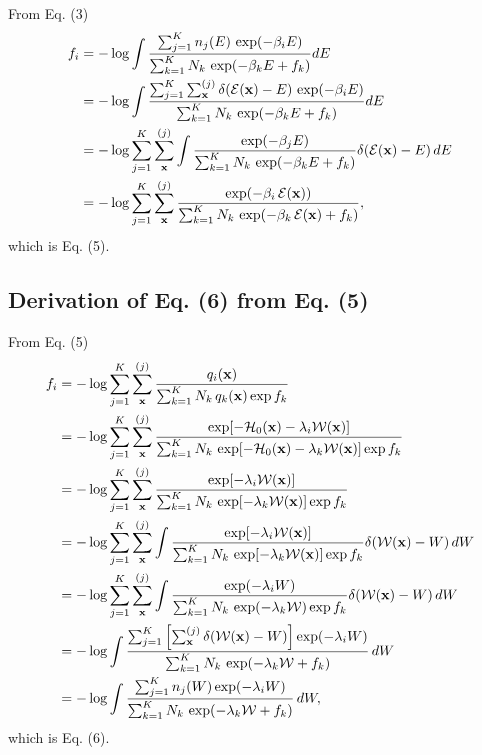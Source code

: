 \documentclass[aip,jcp,preprint,notitlepage, superscriptaddress]{revtex4-1}
\begin{document}
From Eq. (3)
\begin{align*}
f_i
&=
-\log
  \int
    \frac{
      \sum_{j = 1}^K n_j(E) \, \exp(-\beta_i E)
    }
    {
      \sum_{k = 1}^K N_k \, \exp(-\beta_k E + f_k)
    }
    dE
\\
&=
-\log
  \int
    \frac{
      \sum_{j = 1}^K \sum_{\mathbf{x}}^{(j)}
      \delta(\mathcal{E}(\mathbf{x}) - E) \, \exp(-\beta_i E)
    }
    {
      \sum_{k = 1}^K N_k \, \exp(-\beta_k E + f_k)
    }
    dE
\\
&=
-\log
  \sum_{j = 1}^K \sum_{\mathbf{x}}^{(j)}
  \int
    \frac{
      \exp(-\beta_j E)
    }
    {
      \sum_{k = 1}^K N_k \, \exp(-\beta_k E + f_k)
    }
    \delta(\mathcal{E}(\mathbf{x}) - E) \, dE
\\
&=
-\log
  \sum_{j = 1}^K \sum_{\mathbf{x}}^{(j)}
    \frac{
      \exp(-\beta_i \, \mathcal{E}(\mathbf{x}))
    }
    {
      \sum_{k = 1}^K N_k \, \exp(-\beta_k \, \mathcal{E}(\mathbf{x}) + f_k)
    },
\end{align*}
which is Eq. (5).



\subsection{Derivation of Eq. (6) from Eq. (5)}


From Eq. (5)
\begin{align*}
f_i
&=
-\log
\sum_{j = 1}^K
\sum_{\mathbf{x}}^{(j)}
\frac{
  q_i(\mathbf{x})
}
{
  \sum_{k = 1}^K N_k \, q_k(\mathbf{x}) \exp f_k
}
\\
&=
-\log
\sum_{j = 1}^K
\sum_{\mathbf{x}}^{(j)}
\frac{
  \exp[-\mathcal{H}_0(\mathbf{x}) - \lambda_i \mathcal{W}(\mathbf{x})]
}
{
  \sum_{k = 1}^K N_k \,
  \exp[-\mathcal{H}_0(\mathbf{x}) - \lambda_k \mathcal{W}(\mathbf{x})]
  \exp f_k
}
\\
&=
-\log
\sum_{j = 1}^K
\sum_{\mathbf{x}}^{(j)}
\frac{
  \exp[- \lambda_i \mathcal{W}(\mathbf{x})]
}
{
  \sum_{k = 1}^K N_k \,
  \exp[ - \lambda_k \mathcal{W}(\mathbf{x})]
  \exp f_k
}
\\
&=
-\log
\sum_{j = 1}^K
\sum_{\mathbf{x}}^{(j)}
\int
\frac{
  \exp[- \lambda_i \mathcal{W}(\mathbf{x})]
}
{
  \sum_{k = 1}^K N_k \,
  \exp[ - \lambda_k \mathcal{W}(\mathbf{x})]
  \exp f_k
}
\delta(\mathcal{W}(\mathbf{x}) - W) \, dW
\\
&=
-\log
\sum_{j = 1}^K
\sum_{\mathbf{x}}^{(j)}
\int
\frac{
  \exp(- \lambda_i W)
}
{
  \sum_{k = 1}^K N_k \,
  \exp( - \lambda_k \mathcal{W})
  \exp f_k
}
\delta(\mathcal{W}(\mathbf{x}) - W)
\, dW
\\
&=
-\log
\int
\frac{
  \sum_{j = 1}^K
  \left[
    \sum_{\mathbf{x}}^{(j)}
    \delta(\mathcal{W}(\mathbf{x}) - W)
  \right]
  \exp(- \lambda_i W)
}
{
  \sum_{k = 1}^K N_k \,
  \exp( - \lambda_k \mathcal{W} + f_k )
}
\, dW
\\
&=
-\log
\int
\frac{
  \sum_{j = 1}^K
  n_j(W)
  \exp(- \lambda_i W)
}
{
  \sum_{k = 1}^K N_k \,
  \exp( - \lambda_k \mathcal{W} + f_k )
}
\, dW,
\end{align*}
which is Eq. (6).
\end{document}
